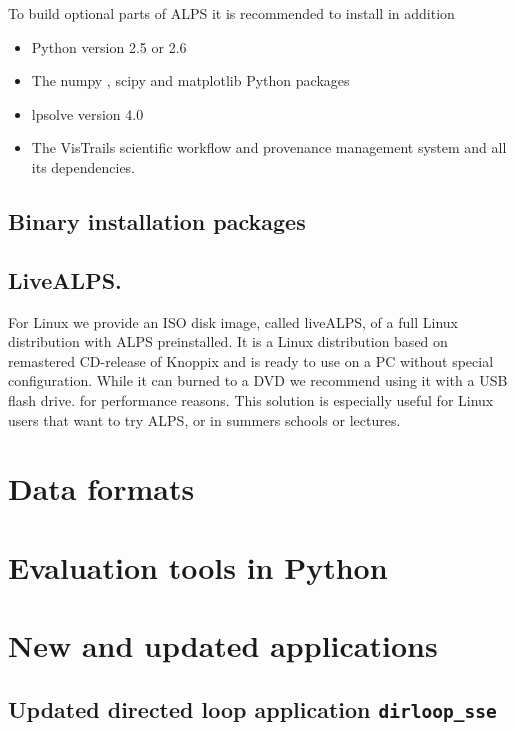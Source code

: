 \documentclass[12pt]{iopart}
\begin{document}
To build optional parts of ALPS it is recommended to install in addition
\begin{itemize}
\item Python version 2.5 or 2.6 \cite{python}
\item The numpy \cite{numpy}, scipy \cite{scipy} and matplotlib \cite{matplotlib} Python packages 
\item lpsolve version 4.0 \cite{lpsolve}
\item The VisTrails scientific workflow and provenance management system \cite{vistrails} and all its dependencies.
\end{itemize}





\subsection{Binary installation packages}
\subsection{LiveALPS.}

For Linux we provide an ISO disk image, called liveALPS, of a full Linux distribution with ALPS preinstalled.  It is a Linux distribution 
based on remastered CD-release of Knoppix \cite{knoppix} and is ready to use 
on a PC without special configuration. While it can burned to a DVD we recommend using it with a USB flash drive. for performance reasons.
This  solution is especially useful for Linux users that want to try ALPS, or in summers schools or lectures.

\section{Data formats}
\section{Evaluation tools in Python}
\section{New and updated applications}
\subsection{Updated directed loop application {\tt dirloop\_sse}}
\end{document}
